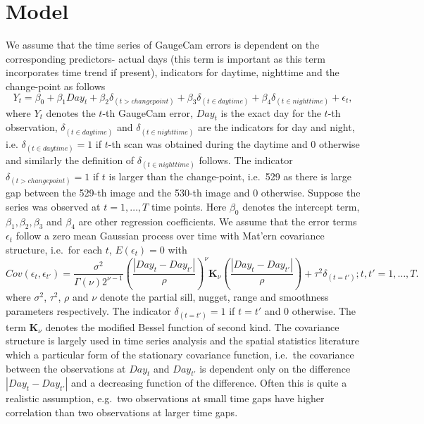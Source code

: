 \documentclass[]{article}
\begin{document}
\section{Model}\label{s:model}

We assume that the time series of GaugeCam errors is dependent on the corresponding predictors- actual days (this term is important as this term incorporates time trend if present), indicators for daytime, nighttime and the change-point as follows
\begin{equation}\label{e:OLS}
  Y_t = \beta_0 + \beta_1 Day_t + \beta_2 \delta_{(t > changepoint)} + \beta_3 \delta_{(t \in daytime)} + \beta_4 \delta_{(t \in nighttime)} + \epsilon_t,
\end{equation}
where \(Y_t\) denotes the \(t\)-th GaugeCam error, \(Day_t\) is the exact day for the \(t\)-th observation, \(\delta_{(t \in daytime)}\) and \(\delta_{(t \in nighttime)}\) are the indicators for day and night, i.e. \(\delta_{(t \in daytime)} = 1\) if \(t\)-th scan was obtained during the daytime and 0 otherwise and similarly the definition of \(\delta_{(t \in nighttime)}\) follows. The indicator \(\delta_{(t > changepoint)} = 1\) if \(t\) is larger than the change-point, i.e.~529 as there is large gap between the 529-th image and the 530-th image and 0 otherwise. Suppose the series was observed at \(t=1, \ldots,T\) time points. Here \(\beta_0\) denotes the intercept term, \(\beta_1, \beta_2, \beta_3\) and \(\beta_4\) are other regression coefficients. We assume that the error terms \(\epsilon_t\) follow a zero mean Gaussian process over time with Mat'ern covariance structure, i.e.~for each \(t\), \(E(\epsilon_t) = 0\) with
\[Cov(\epsilon_t, \epsilon_{t'}) = \frac{\sigma^2}{\Gamma(\nu) 2^{\nu - 1}} \left( \frac{|Day_t - Day_{t'}|}{\rho} \right)^{\nu} \mathbf{K}_{\nu} \left( \frac{|Day_t - Day_{t'}|}{\rho} \right) + \tau^2 \delta_{(t = t')}; t,t' =1, \ldots,T.\]
where \(\sigma^2\), \(\tau^2\), \(\rho\) and \(\nu\) denote the partial sill, nugget, range and smoothness parameters respectively. The indicator \(\delta_{(t = t')}=1\) if \(t=t'\) and 0 otherwise. The term \(\mathbf{K}_{\nu}\) denotes the modified Bessel function of second kind. The covariance structure is largely used in time series analysis and the spatial statistics literature which a particular form of the stationary covariance function, i.e.~the covariance between the observations at \(Day_t\) and \(Day_{t'}\) is dependent only on the difference \(|Day_t - Day_{t'}|\) and a decreasing function of the difference. Often this is quite a realistic assumption, e.g.~two observations at small time gaps have higher correlation than two observations at larger time gaps.
\end{document}
